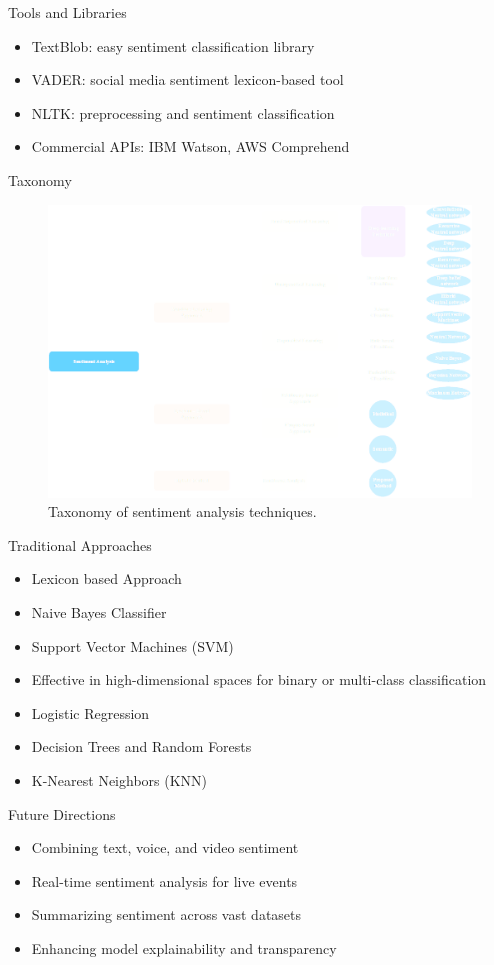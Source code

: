 \begin{frame}{Tools and Libraries}
    \begin{itemize}
        \item TextBlob: easy sentiment classification library
        \item VADER: social media sentiment lexicon-based tool
        \item NLTK: preprocessing and sentiment classification
        \item Commercial APIs: IBM Watson, AWS Comprehend
    \end{itemize}
\end{frame}

\begin{frame}{Taxonomy}
\begin{figure}
\centering
\includegraphics[width=0.7\linewidth]{Images/SATaxonomy}
\caption[SATaxonomy]{Taxonomy of sentiment analysis techniques\cite{Dang_2020}.}
\label{fig:sataxonomy}
\end{figure}
\end{frame}

\begin{frame}{Traditional Approaches}

\begin{itemize}
    \item Lexicon based Approach
    \item {Naive Bayes Classifier}
	\item Support Vector Machines (SVM)
	\item Effective in high-dimensional spaces for binary or multi-class classification
	\item Logistic Regression
	\item Decision Trees and Random Forests
	\item K-Nearest Neighbors (KNN)
\end{itemize}
\end{frame}

\begin{frame}{Future Directions}
    \begin{itemize}
        \item Combining text, voice, and video sentiment
        \item Real-time sentiment analysis for live events
        \item Summarizing sentiment across vast datasets
        \item Enhancing model explainability and transparency
    \end{itemize}
\end{frame}
